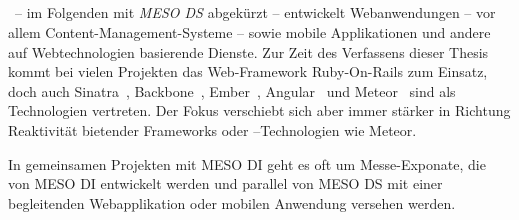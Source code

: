 \subsection{\mesods}
\label{ssec:em_meso_digital_services}

\mesods~-- im Folgenden mit \emph{MESO DS} abgekürzt -- entwickelt
Webanwendungen -- vor allem Content-Management-Systeme -- sowie mobile
Applikationen und andere auf Webtechnologien basierende Dienste.  Zur Zeit des
Verfassens dieser Thesis kommt bei vielen Projekten das Web-Framework
Ruby-On-Rails zum Einsatz, doch auch Sinatra~\cite{sinatra},
Backbone~\cite{backbone}, Ember~\cite{ember}, Angular~\cite{angular} und
Meteor~\cite{meteor} sind als Technologien vertreten.  Der Fokus verschiebt
sich aber immer stärker in Richtung Reaktivität bietender Frameworks oder
--Technologien wie Meteor.

In gemeinsamen Projekten mit MESO DI geht es oft um Messe-Exponate, die von MESO
DI entwickelt werden und parallel von MESO DS mit einer begleitenden
Webapplikation oder mobilen Anwendung versehen werden.
